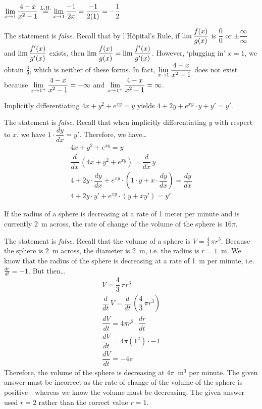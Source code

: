 \documentclass[11pt,letterpaper]{article}
\begin{document}
 $\displaystyle\lim_{x \to 1} \dfrac{4 - x}{x^2 - 1} \stackrel{\text{L.H.}}{=} \lim_{x \to 1} \dfrac{-1}{2x}= \dfrac{-1}{2(1)}= -\dfrac{1}{2}$ \pspace

\sol The statement is \textit{false}. Recall that by l'H\^opital's Rule, if $\displaystyle\lim \dfrac{f(x)}{g(x)}$ is $\dfrac{0}{0}$ or $\pm\dfrac{\infty}{\infty}$ and $\displaystyle\lim \dfrac{f'(x)}{g'(x)}$ exists, then $\displaystyle\lim \dfrac{f(x)}{g(x)}= \lim \dfrac{f'(x)}{g'(x)}$. However, `plugging in' $x= 1$, we obtain $\frac{3}{0}$, which is neither of these forms. In fact, $\displaystyle\lim_{x \to 1} \dfrac{4 - x}{x^2 - 1}$ does not exist because $\displaystyle\lim_{x \to 1^+} \dfrac{4 - x}{x^2 - 1}= -\infty$ and $\displaystyle\lim_{x \to 1^+} \dfrac{4 - x}{x^2 - 1}= \infty$. \pvspace{1.3cm}



 Implicitly differentiating $4x + y^2 + e^{xy}= y$ yields $4 + 2y + e^{xy} \cdot y + y' = y'$. \pspace

\sol The statement is \textit{false}. Recall that when implicitly differentiating $y$ with respect to $x$, we have $1 \cdot \dfrac{dy}{dx}= y'$. Therefore, we have\dots
	\[
	\begin{gathered}
	4x + y^2 + e^{xy}= y \\[0.2cm]
	\dfrac{d}{dx} \, \left(4x + y^2 + e^{xy} \right)= \dfrac{d}{dx} \, y \\[0.2cm]
	4 + 2y \cdot \dfrac{dy}{dx} + e^{xy} \cdot \left( 1 \cdot y + x \cdot \dfrac{dy}{dx} \right)= \dfrac{dy}{dx} \\[0.2cm]
	4 + 2y \cdot y' + e^{xy} \cdot \left( y + x y' \right)= y'
	\end{gathered}
	\]



\newpage



 If the radius of a sphere is decreasing at a rate of 1 meter per minute and is currently 2~m across, the rate of change of the volume of the sphere is $16\pi$. \pspace

\sol The statement is \textit{false}. Recall that the volume of a sphere is $V= \frac{4}{3} \,\pi r^3$. Because the sphere is 2~m across, the diameter is 2~m, i.e. the radius is $r= 1$~m. We know that the radius of the sphere is decreasing at a rate of 1~m per minute, i.e. $\frac{dr}{dt}= -1$. But then\dots
	\[
	\begin{gathered}
	V= \dfrac{4}{3} \,\pi r^3 \\
	\dfrac{d}{dt}\, V= \dfrac{d}{dt} \, \left( \dfrac{4}{3} \,\pi r^3 \right) \\
	\dfrac{dV}{dt}= 4\pi r^2 \cdot \dfrac{dr}{dt} \\
	\dfrac{dV}{dt}= 4\pi (1^2) \cdot -1 \\
	\dfrac{dV}{dt}= -4\pi
	\end{gathered}
	\]
Therefore, the volume of the sphere is decreasing at $4\pi$~m$^3$ per minute. The given answer must be incorrect as the rate of change of the volume of the sphere is positive---whereas we know the volume must be decreasing. The given answer used $r= 2$ rather than the correct value $r= 1$. \pvspace{1.3cm}
\end{document}
